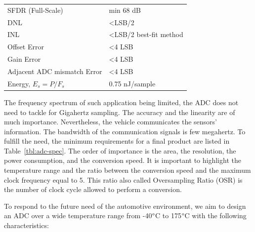 \begin{table}[htp]
\begin{tabular}{ll}
		SFDR (Full-Scale)                & min 68 dB                                                                                               \\
		DNL                              & \textless LSB/2                                                                                       \\
		INL                              & \textless LSB/2 best-fit method                                                                                    \\
		Offset Error                     & \textless 4 LSB                                                                                                                                             \\
		Gain Error                       & \textless 4 LSB                                                                                                                                             \\
		Adjacent ADC mismatch Error      & \textless 4 LSB                                                                                                                                             \\
		Energy, $E_s = P/F_s$            & 0.75 nJ/sample      \\ \bottomrule
	\end{tabular}
\end{table}

The frequency spectrum of such application being limited, the ADC does not need to tackle for Gigahertz sampling. The accuracy and the linearity are of much importance. Nevertheless, the vehicle communicates the sensors' information. The bandwidth of the communication signals is few megahertz.
To fulfill the need, the minimum requirements for a final product are listed in Table~\ref{tbl:adc-spec}. The order of importance is the area, the resolution, the power consumption, and the conversion speed. It is important to highlight the temperature range and the ratio between the conversion speed and the maximum clock frequency equal to 5. This ratio also called Oversampling Ratio (OSR) is the number of clock cycle allowed to perform a conversion.

To respond to the future need of the automotive environment, we aim to design an ADC over a wide temperature range from -40\(\degree \)C to 175\(\degree \)C with the following characteristics:

